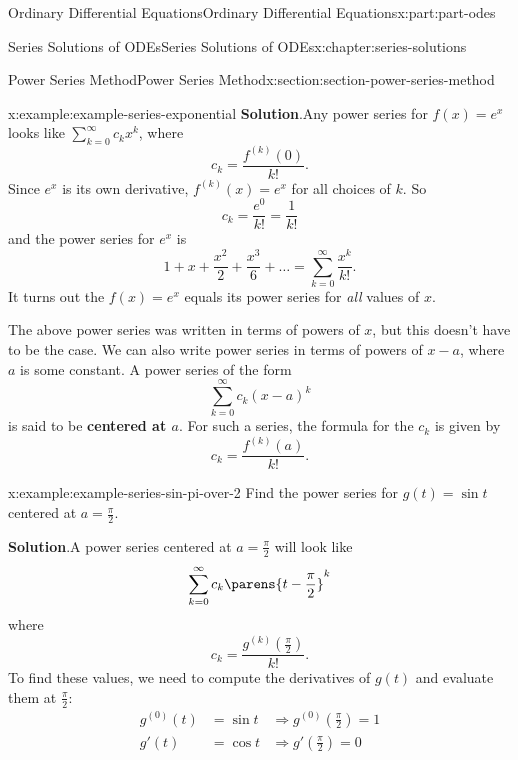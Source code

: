 \documentclass[oneside,10pt,]{book}
\newcommand{\blocktitlefont}{\relax}
\newcommand{\terminology}[1]{\textbf{#1}}
\numberwithin{equation}{part}
\newcommand{\amp}{&}
\begin{document}
\begin{partptx}{Ordinary Differential Equations}{}{Ordinary Differential Equations}{}{}{x:part:part-odes}
\begin{chapterptx}{Series Solutions of ODEs}{}{Series Solutions of ODEs}{}{}{x:chapter:series-solutions}
\begin{sectionptx}{Power Series Method}{}{Power Series Method}{}{}{x:section:section-power-series-method}
\begin{example}{}{x:example:example-series-exponential}
\noindent\textbf{\blocktitlefont Solution}.\hypertarget{g:solution:idp105548781219488}{}\quad{}Any power series for \(f(x) = e^{x}\) looks like \(\sum_{k=0}^{\infty}c_{k}x^{k}\), where%
\begin{equation*}
c_{k} = \frac{f^{(k)}(0)}{k!}.
\end{equation*}
Since \(e^{x}\) is its own derivative, \(f^{(k)}(x) = e^{x}\) for all choices of \(k\). So%
\begin{equation*}
c_{k} = \frac{e^{0}}{k!} = \frac{1}{k!}
\end{equation*}
and the power series for \(e^{x}\) is%
\begin{equation*}
1+x+\frac{x^{2}}{2}+\frac{x^{3}}{6} + \dots = \sum_{k=0}^{\infty}\frac{x^{k}}{k!}.
\end{equation*}
It turns out the \(f(x) = e^{x}\) equals its power series for \emph{all} values of \(x\).%
\end{example}
The above power series was written in terms of powers of \(x\), but this doesn't have to be the case. We can also write power series in terms of powers of \(x-a\), where \(a\) is some constant. A power series of the form%
\begin{equation*}
\sum_{k=0}^{\infty}c_{k}(x-a)^{k}
\end{equation*}
is said to be \terminology{centered at \(a\)}. For such a series, the formula for the \(c_{k}\) is given by%
\begin{equation*}
c_{k} = \frac{f^{(k)}(a)}{k!}.
\end{equation*}
%
\begin{example}{}{x:example:example-series-sin-pi-over-2}%
Find the power series for \(g(t) = \sin t\) centered at \(a = \frac{\pi}{2}\).%
\par\smallskip%
\noindent\textbf{\blocktitlefont Solution}.\hypertarget{g:solution:idp105548781229088}{}\quad{}A power series centered at \(a = \frac{\pi}{2}\) will look like%
\begin{equation*}
\sum_{k=0}^{\infty}c_{k}\parens{t-\frac{\pi}{2}}^{k}
\end{equation*}
where%
\begin{equation*}
c_{k} = \frac{g^{(k)}(\frac{\pi}{2})}{k!}.
\end{equation*}
To find these values, we need to compute the derivatives of \(g(t)\) and evaluate them at \(\frac{\pi}{2}\):%
\begin{align*}
g^{(0)}(t) \amp= \sin t \amp\Rightarrow g^{(0)}(\frac{\pi}{2}) = 1\\
g'(t) \amp= \cos t \amp\Rightarrow g'(\frac{\pi}{2}) = 0\\

\end{align*}
\end{example}
\end{sectionptx}
\end{chapterptx}
\end{partptx}
\end{document}
